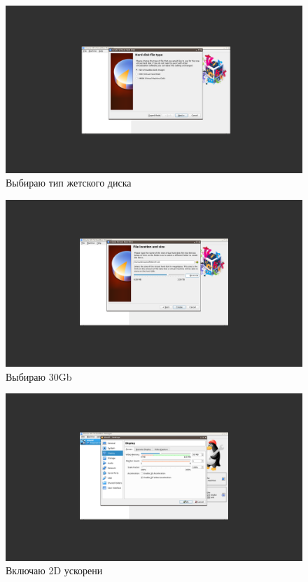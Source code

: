 \documentclass[a4paper]{article}
\begin{document}
\begin{figure}[H]
    \centering
    \includegraphics[width=\linewidth]{4.png}
    \caption{Выбираю тип жетского диска}
\end{figure}

\begin{figure}[H]
    \centering
    \includegraphics[width=\linewidth]{5.png}
    \caption{Выбираю 30Gb}
\end{figure}

\begin{figure}[H]
    \centering
    \includegraphics[width=\linewidth]{7.png}
    \caption{Включаю 2D ускорени}
\end{figure}
\end{document}
